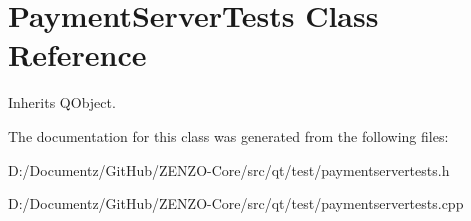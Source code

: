 \hypertarget{class_payment_server_tests}{}\section{Payment\+Server\+Tests Class Reference}
\label{class_payment_server_tests}


Inherits Q\+Object.



The documentation for this class was generated from the following files\+:\begin{DoxyCompactItemize}
\item 
D\+:/\+Documentz/\+Git\+Hub/\+Z\+E\+N\+Z\+O-\/\+Core/src/qt/test/paymentservertests.\+h\item 
D\+:/\+Documentz/\+Git\+Hub/\+Z\+E\+N\+Z\+O-\/\+Core/src/qt/test/paymentservertests.\+cpp\end{DoxyCompactItemize}

